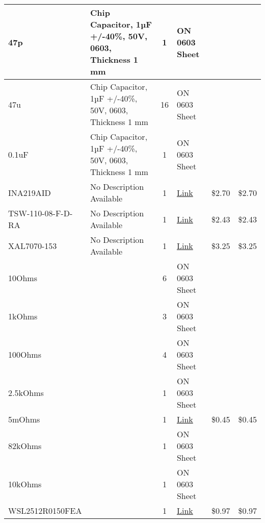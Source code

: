 \begin{xltabular}{\textwidth} {|X|X|c|X|c|c|}
    \hline
    47p & Chip Capacitor, 1µF +/-40\%, 50V, 0603, Thickness 1 mm & 1 & ON 0603 Sheet & & \\
    
    \hline
    47u & Chip Capacitor, 1µF +/-40\%, 50V, 0603, Thickness 1 mm & 16 & ON 0603 Sheet & & \\

    \hline
    0.1uF & Chip Capacitor, 1µF +/-40\%, 50V, 0603, Thickness 1 mm & 1 & ON 0603 Sheet & & \\

    \hline
    INA219AID & No Description Available & 1 & \href{https://www.digikey.com/en/products/detail/texas-instruments/INA219AID/2047415}{Link} & \$2.70 & \$2.70 \\

    \hline
    TSW-110-08-F-D-RA & No Description Available & 1 & \href{https://www.digikey.com/en/products/detail/TSW-110-08-F-D-RA/SAM10352-ND/6679089?curr=usd\&utm_campaign=buynow\&utm_medium=aggregator\&utm_source=octopart}{Link} & \$2.43 & \$2.43 \\

    \hline
    XAL7070-153 & No Description Available & 1 & \href{https://www.coilcraft.com/en-us/products/power/shielded-inductors/molded-inductor/xal/xal7070/xal7070-153/}{Link} & \$3.25 & \$3.25 \\

    \hline
    10Ohms & & 6 & ON 0603 Sheet & & \\
    
    \hline
    1kOhms & & 3 & ON 0603 Sheet & & \\

    \hline
    100Ohms & & 4 & ON 0603 Sheet & & \\

    \hline
    2.5kOhms & & 1 & ON 0603 Sheet & & \\

    \hline
    5mOhms & & 1 & \href{https://www.digikey.com/en/products/detail/panasonic-electronic-components/ERJ-3LWFR005V/6004265}{Link} & \$0.45 & \$0.45 \\

    \hline
    82kOhms & & 1 & ON 0603 Sheet & & \\

    \hline
    10kOhms & & 1 & ON 0603 Sheet & & \\

    \hline
    WSL2512R0150FEA & & 1 & \href{https://www.digikey.com/en/products/detail/vishay-dale/WSL2512R0150FEA/712562}{Link} & \$0.97 & \$0.97 \\


\end{xltabular}
